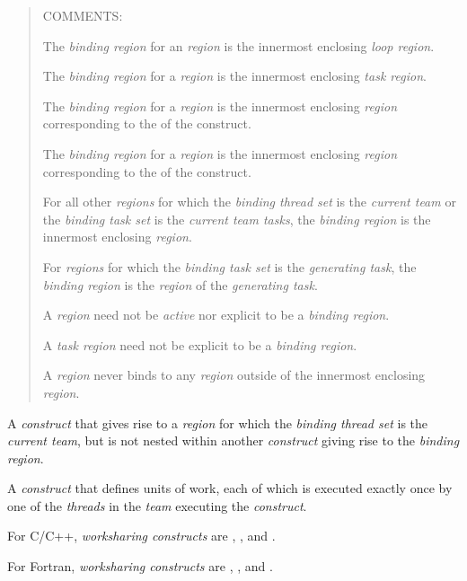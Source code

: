 \begin{quote}
COMMENTS:

The \emph{binding region} for an  \emph{region} is the 
innermost enclosing \emph{loop region}.

The \emph{binding region} for a  \emph{region} is the 
innermost enclosing \emph{task region}.

The \emph{binding region} for a  \emph{region} is the 
innermost enclosing \emph{region} corresponding to the 
 of the  construct.

The \emph{binding region} for a  \emph{region} 
is the innermost enclosing \emph{region} corresponding to the 
 of the  construct.

For all other \emph{regions} for which the \emph{binding thread set} is 
the \emph{current team} or the \emph{binding task set} is the 
\emph{current team tasks}, the \emph{binding region} is the innermost 
enclosing  \emph{region}.

For \emph{regions} for which the \emph{binding task set} is the 
\emph{generating task}, the \emph{binding region} is the \emph{region} 
of the \emph{generating task}.

A  \emph{region} need not be \emph{active} nor explicit 
to be a \emph{binding region}.

A \emph{task region} need not be explicit to be a \emph{binding region}.

A \emph{region} never binds to any \emph{region} outside of the innermost 
enclosing  \emph{region}.
\end{quote}
\glossarydefend

\glossarydefstart
A \emph{construct} that gives rise to a \emph{region} for which the 
\emph{binding thread set} is the \emph{current team}, but is not nested 
within another \emph{construct} giving rise to the \emph{binding region}.
\glossarydefend

\glossarydefstart
A \emph{construct} that defines units of work, each of which is executed 
exactly once by one of the \emph{threads} in the \emph{team} executing 
the \emph{construct}.

For C/C++, \emph{worksharing constructs} are , , 
and .

For Fortran, \emph{worksharing constructs} are , , 
 and .
\glossarydefend

